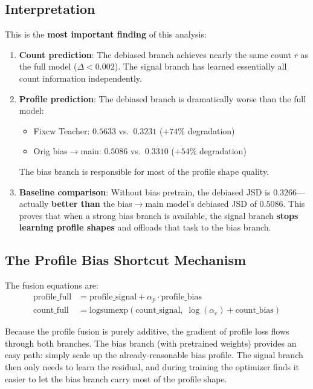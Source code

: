 \documentclass[11pt,a4paper]{article}
\begin{document}
\subsection{Interpretation}

This is the \textbf{most important finding} of this analysis:

\begin{enumerate}
\item \textbf{Count prediction}: The debiased branch achieves nearly the same count $r$ as the full model ($\Delta < 0.002$). The signal branch has learned essentially all count information independently.

\item \textbf{Profile prediction}: The debiased branch is dramatically worse than the full model:
\begin{itemize}
\item Fixcw Teacher: $0.5633$ vs.\ $0.3231$ ($+74\%$ degradation)
\item Orig bias$\to$main: $0.5086$ vs.\ $0.3310$ ($+54\%$ degradation)
\end{itemize}
The bias branch is responsible for most of the profile shape quality.

\item \textbf{Baseline comparison}: Without bias pretrain, the debiased JSD is $0.3266$---actually \textbf{better than} the bias$\to$main model's debiased JSD of $0.5086$. This proves that when a strong bias branch is available, the signal branch \textbf{stops learning profile shapes} and offloads that task to the bias branch.
\end{enumerate}

\subsection{The Profile Bias Shortcut Mechanism}

The fusion equations are:
\begin{align}
\text{profile\_full} &= \text{profile\_signal} + \alpha_p \cdot \text{profile\_bias} \\
\text{count\_full} &= \text{logsumexp}(\text{count\_signal},\; \log(\alpha_c) + \text{count\_bias})
\end{align}

Because the profile fusion is purely additive, the gradient of profile loss flows through both branches. The bias branch (with pretrained weights) provides an easy path: simply scale up the already-reasonable bias profile. The signal branch then only needs to learn the residual, and during training the optimizer finds it easier to let the bias branch carry most of the profile shape.
\end{document}
